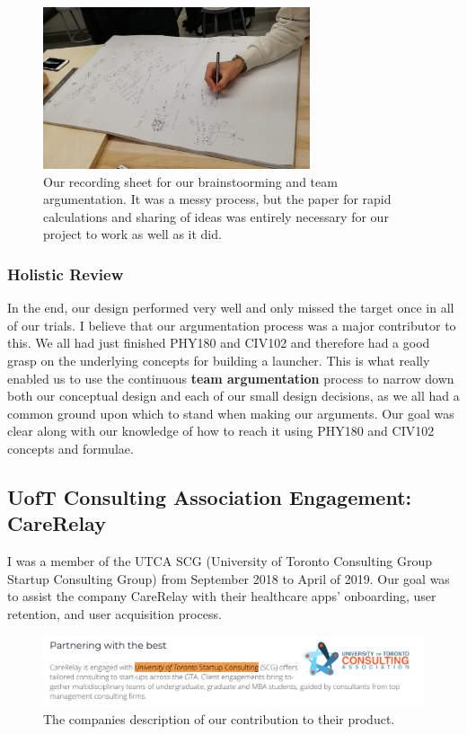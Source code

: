 \documentclass[a4paper,12pt]{article}
\begin{document}
\begin{figure}[H]
\centering
\includegraphics[width=0.7\textwidth]{img/image008.png}
\caption{Our recording sheet for our brainstoorming and team argumentation. It was a messy process, but the paper for rapid calculations and sharing of ideas was entirely necessary for our project to work as well as it did.}
\label{}
\end{figure}

\subsubsection{Holistic Review}
In the end, our design performed very well and only missed the target once in all of our trials. I believe that our argumentation process was a major contributor to this. We all had just finished PHY180 and CIV102 and therefore had a good grasp on the underlying concepts for building a launcher. This is what really enabled us to use the continuous \textbf{team argumentation} process to narrow down both our conceptual design and each of our small design decisions, as we all had a common ground upon which to stand when making our arguments. Our goal was clear along with our knowledge of how to reach it using PHY180 and CIV102 concepts and formulae.

\subsection{UofT Consulting Association Engagement: CareRelay}
I was a member of the UTCA SCG (University of Toronto Consulting Group Startup Consulting Group) from September 2018 to April of 2019. Our goal was to assist the company CareRelay with their healthcare apps’ onboarding, user retention, and user acquisition process. 

\begin{figure}[H]
\centering
\includegraphics[width=1\textwidth]{img/image009.png}
\caption{The companies description of our contribution to their product.}
\label{}
\end{figure}
\end{document}
